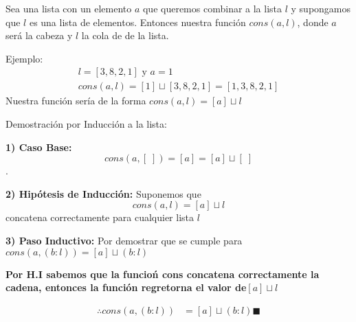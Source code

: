     Sea una lista con un elemento $a$ que queremos combinar a la lista $l$ y supongamos que $l$ es una lista de elementos.
    Entonces nuestra función $cons(a,l)$, donde $a$ será la cabeza y $l$ la cola de de la lista.

    Ejemplo:
    \begin{gather*}
        l=[3,8,2,1] \text{ y } a=1\\
        cons(a,l)=[1]\sqcup [3,8,2,1] = [1,3,8,2,1]
    \end{gather*}
    Nuestra función sería de la forma $cons(a,l)=[a]\sqcup l$

    Demostración por Inducción a la lista:

    \textbf{1) Caso Base:} $$cons(a,[\;]) =[a] =[a]\sqcup [\;]$$.

    \textbf{2) Hipótesis de Inducción: }Suponemos que $$cons(a,l)=[a]\sqcup l$$ concatena correctamente para cualquier lista $l$   

    \textbf{3) Paso Inductivo: }Por demostrar que se cumple para $cons(a,(b:l))=[a]\sqcup (b:l)$
\vspace*{1em}

\textbf{Por H.I sabemos que la funcioń cons concatena correctamente la cadena, entonces la función regretorna el valor de}$[a]\sqcup l$ 

    \begin{align}
            \therefore cons(a,(b:l))&=[a]\sqcup (b:l) \blacksquare
    \end{align}
